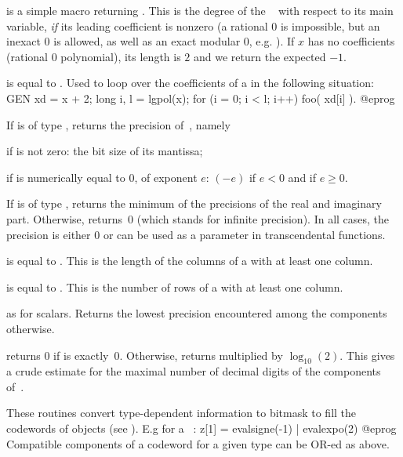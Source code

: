  is a simple macro returning .
This is the degree of the ~ with respect to its main
variable, \emph{if} its leading coefficient is nonzero (a rational $0$ is
impossible, but an inexact $0$ is allowed, as well as an exact modular $0$,
e.g. ). If $x$ has no coefficients (rational $0$ polynomial),
its length is $2$ and we return the expected $-1$.

 is equal to . Used to loop over
the coefficients of a  in the following situation:
\bprog
    GEN xd = x + 2;
    long i, l = lgpol(x);
    for (i = 0; i < l; i++) foo( xd[i] ).
@eprog

 If  is of type , returns the
precision of~, namely

\item if  is not zero: the bit size of its mantissa;

\item if  is numerically equal to $0$, of exponent $e$:
$(-e)$ if $e < 0$ and  if $e \geq 0$.

If  is of type , returns the minimum of the precisions of
the real and imaginary part. Otherwise, returns~0 (which stands for infinite
precision). In all cases, the precision is either $0$ or can be used as a
 parameter in transcendental functions.

 is equal to . This is the length
of the columns of a  with at least one column.

 is equal to . This is the number
of rows of a  with at least one column.

 as  for scalars. Returns the
lowest precision encountered among the components otherwise.

 returns 0 if  is exactly~0. Otherwise,
returns  multiplied by $\log_{10}(2)$. This gives a crude
estimate for the maximal number of decimal digits of the components
of~.

These routines convert type-dependent information to bitmask to fill the
codewords of  objects (see ). E.g for a
~:
\bprog
  z[1] = evalsigne(-1) | evalexpo(2)
@eprog
Compatible components of a codeword for a given type can be OR-ed as above.

